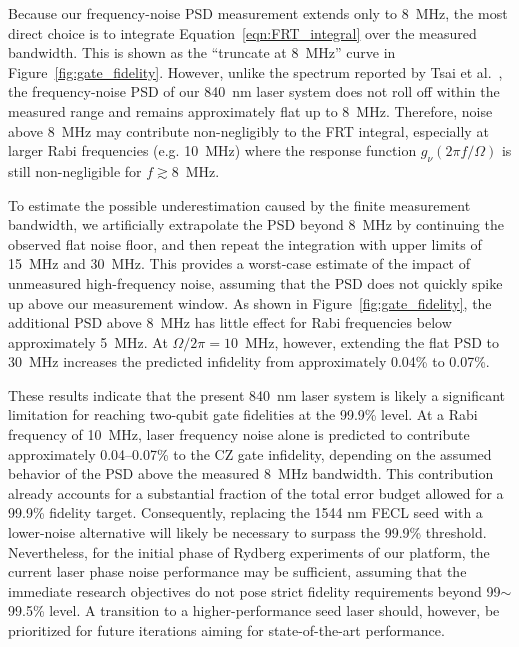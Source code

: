 \documentclass[11pt]{report}
\begin{document}
Because our frequency-noise PSD measurement extends only to 8~MHz, the most direct choice is to integrate Equation~\ref{eqn:FRT_integral} over the measured bandwidth. This is shown as the ``truncate at 8~MHz'' curve in Figure~\ref{fig:gate_fidelity}. However, unlike the spectrum reported by Tsai et al.\ \cite{Tsai2025}, the frequency-noise PSD of our 840~nm laser system does not roll off within the measured range and remains approximately flat up to 8~MHz. Therefore, noise above 8~MHz may contribute non-negligibly to the FRT integral, especially at larger Rabi frequencies (e.g. 10~MHz) where the response function $g_\nu(2\pi f/\Omega)$ is still non-negligible for $f \gtrsim 8$~MHz.

To estimate the possible underestimation caused by the finite measurement bandwidth, we artificially extrapolate the PSD beyond 8~MHz by continuing the observed flat noise floor, and then repeat the integration with upper limits of 15~MHz and 30~MHz. This provides a worst-case estimate of the impact of unmeasured high-frequency noise, assuming that the PSD does not quickly spike up above our measurement window. As shown in Figure~\ref{fig:gate_fidelity}, the additional PSD above 8~MHz has little effect for Rabi frequencies below approximately 5~MHz. At $\Omega/2\pi = 10$~MHz, however, extending the flat PSD to 30~MHz increases the predicted infidelity from approximately 0.04\% to 0.07\%.

These results indicate that the present 840~nm laser system is likely a significant limitation for reaching two-qubit gate fidelities at the 99.9\% level. At a Rabi frequency of 10~MHz, laser frequency noise alone is predicted to contribute approximately 0.04--0.07\% to the CZ gate infidelity, depending on the assumed behavior of the PSD above the measured 8~MHz bandwidth. This contribution already accounts for a substantial fraction of the total error budget allowed for a 99.9\% fidelity target. Consequently, replacing the 1544 nm FECL seed with a lower-noise alternative will likely be necessary to surpass the 99.9\% threshold. Nevertheless, for the initial phase of Rydberg experiments of our platform, the current laser phase noise performance may be sufficient, assuming that the immediate research objectives do not pose strict fidelity requirements beyond  99$\sim$99.5\% level. A transition to a higher-performance seed laser should, however, be prioritized for future iterations aiming for state-of-the-art performance.



\end{document}
